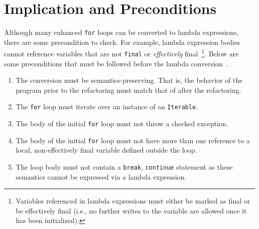 \section{Implication and Preconditions}

Although many enhanced \lstinline{for} loops can be converted to lambda
expressions, there are some precondition to check. For example, lambda
expression bodies cannot reference variables that are not \lstinline{final} or
\emph{effectively} final~\cite{gosling2014java}\footnote{Variables referenced
    in lambda expressions must either be marked as final or be effectively
    final (i.e., no further writes to the variable are allowed once it has
been initialized).}.  Below are some preconditions that must be followed
before the lambda conversion~\cite{gyori2013}. 

\begin{enumerate}

    \item The conversion must be semantics-preserving. That is, the behavior
        of the program prior to the refactoring must match that of after the
        refactoring.

    \item The \lstinline{for} loop must iterate over an instance of an
        \lstinline{Iterable}.

    \item The body of the initial \lstinline{for} loop must not throw a
        checked exception. 

    \item The body of the initial \lstinline{for} loop must not have more than
        one reference to a local, non-effectively final variable defined
        outside the loop.

    \item The loop body must not contain a \lstinline{break},
        \lstinline{continue} statement as these semantics cannot be expressed
        via a lambda expression.  

\end{enumerate}
